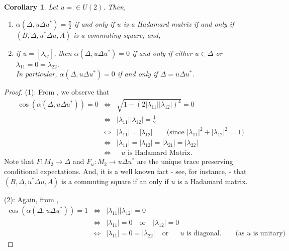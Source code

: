 \documentclass[a4]{amsart}
\newtheorem{corollary}[theorem]{\bf Corollary}
\numberwithin{equation}{section}
\begin{document}
\begin{corollary}\label{Hadamard}  Let $u=\in U(2)$. Then,
  \begin{enumerate}
    \item $\alpha(\Delta, u \Delta u^*) = \frac{\pi}{2}$ if and only
      if $u$ is a Hadamard matrix if and only if $(B, \Delta, u^*
      \Delta u, A)$ is a commuting square; and,
    \item if $u=[\lambda_{ij}]$, then $\alpha(\Delta, u \Delta u^*) =
      0 $ if and only if either $u\in \Delta$ or $\lambda_{11} = 0
      =\lambda_{22}$.\\ In particular, $\alpha(\Delta, u\Delta u^*)=0$
      if and only if $\Delta = u\Delta u^*$.
  \end{enumerate}

\end{corollary}
\begin{proof}
  (1): From , we observe that 
  \begin{eqnarray*}
\cos(\alpha(\Delta,  u\Delta u^*)) = 0 & \Leftrightarrow &
\sqrt{1-(2|\lambda_{11}||\lambda_{12}|)^4} = 0 \\ & \Leftrightarrow &
|\lambda_{11}||\lambda_{12}| = \frac{1}{2} \\ & \Leftrightarrow &
|\lambda_{11}| = |\lambda_{12}| \qquad \text{(since $|\lambda_{11}|^2
  + |\lambda_{12}|^2$ = 1)} \\ & \Leftrightarrow &
|\lambda_{11}|= |\lambda_{12}| = |\lambda_{21}| = |\lambda_{22}|
\\ &\Leftrightarrow & \text{ $u$ is Hadamard Matrix}.
  \end{eqnarray*}
Note that $F: M_2 \to \Delta$ and $F_u: M_2 \to u\Delta u^*$ are the
unique trace preserving conditional expectations. And, it is a well
known fact - see, for instance, \cite[$\S 5.2.2$]{JS} - that $(B, \Delta, u^*
\Delta u, A)$ is a commuting square if an only if $u$ is a Hadamard
matrix.  \smallskip

  (2): Again, from ,  \begin{eqnarray*}
           \cos(\alpha(\Delta, u \Delta u^*)) = 1 
          & \Leftrightarrow & |\lambda_{11}||\lambda_{12}|= 0  \\ 
          & \Leftrightarrow & |\lambda_{11}| = 0 \quad\text{or} \quad |\lambda_{12}| = 0 \\
          & \Leftrightarrow & |\lambda_{11}| = 0 = |\lambda_{22}| \quad\text{or} \quad \text{ $u$ is diagonal}. \qquad \text{(as $u$ is unitary)}
\end{eqnarray*}
  \end{proof}
\end{document}
